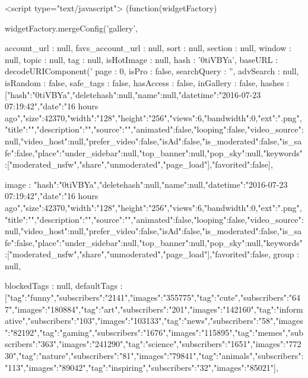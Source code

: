 {{        <script type="text/javascript">
    (function(widgetFactory) {
        widgetFactory.mergeConfig('gallery', {
            account_url         : null,
            favs_account_url    : null,
            sort                : null,
            section             : null,
            window              : null,
            topic               : null,
            tag                 : null,
            isHotImage          : null,
            hash                : '0tiVBYa',
            baseURL             : decodeURIComponent('%
            page                : 0,
            isPro               : false,
            searchQuery         : '',
            advSearch           : null,
            isRandom            : false,
            safe_tags           : false,
            hasAccess           : false,
            inGallery           : false,
            hashes              : [{"hash":"0tiVBYa","deletehash":null,"name":null,"datetime":"2016-07-23 07:19:42","date":"16 hours ago","size":42370,"width":"128","height":"256","views":6,"bandwidth":0,"ext":".png","title":"","description":"","source":"","animated":false,"looping":false,"video_source":null,"video_host":null,"prefer_video":false,"isAd":false,"is_moderated":false,"is_safe":false,"place":{"under_sidebar":null,"top_banner":null,"pop_sky":null,"keywords":["moderated_nsfw","share","unmoderated","page_load"]},"favorited":false}],
        
            image               : {"hash":"0tiVBYa","deletehash":null,"name":null,"datetime":"2016-07-23 07:19:42","date":"16 hours ago","size":42370,"width":"128","height":"256","views":6,"bandwidth":0,"ext":".png","title":"","description":"","source":"","animated":false,"looping":false,"video_source":null,"video_host":null,"prefer_video":false,"isAd":false,"is_moderated":false,"is_safe":false,"place":{"under_sidebar":null,"top_banner":null,"pop_sky":null,"keywords":["moderated_nsfw","share","unmoderated","page_load"]},"favorited":false},
            group               : null,
        
            blockedTags         : null,
                    defaultTags         : [{"tag":"funny","subscribers":"2141","images":"355775"},{"tag":"cute","subscribers":"647","images":"180884"},{"tag":"art","subscribers":"201","images":"142160"},{"tag":"informative","subscribers":"103","images":"103133"},{"tag":"news","subscribers":"58","images":"82192"},{"tag":"gaming","subscribers":"1676","images":"115895"},{"tag":"memes","subscribers":"363","images":"241290"},{"tag":"science","subscribers":"1651","images":"77230"},{"tag":"nature","subscribers":"81","images":"79841"},{"tag":"animals","subscribers":"113","images":"89042"},{"tag":"inspiring","subscribers":"32","images":"85021"}],
        
}}}}
